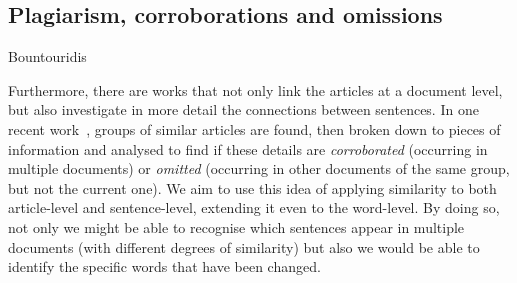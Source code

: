 


\subsection{Plagiarism, corroborations and omissions}

Bountouridis

Furthermore, there are works that not only link the articles at a document level, but also investigate in more detail the connections between sentences.
In one recent work~\cite{bountouridis2018explaining}, groups of similar articles are found, then broken down to pieces of information and analysed to find if these details are \emph{corroborated} (occurring in multiple documents) or \emph{omitted} (occurring in other documents of the same group, but not the current one). 
We aim to use this idea of applying similarity to both article-level and sentence-level, extending it even to the word-level. By doing so,
not only we might be able to recognise which sentences appear in multiple documents (with different degrees of similarity) but also we would be able to identify the specific words that have been changed.

